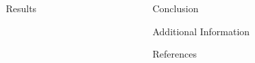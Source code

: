 \documentclass[final]{beamer}
\newlength{\sepwid}
\newlength{\onecolwid}
\newlength{\twocolwid}
\begin{document}
\begin{frame}[t]
\begin{columns}[t]
\begin{column}{\twocolwid}
\begin{columns}[t,totalwidth=\twocolwid]
\begin{column}{\onecolwid}
\end{column} %

\begin{column}{\onecolwid} %


\begin{block}{Results}


\end{block}


\end{column} %

\end{columns} %

\end{column} %

\begin{column}{\sepwid}\end{column} %

\begin{column}{\onecolwid} %


\begin{block}{Conclusion}

\end{block}

\begin{block}{Additional Information}

\end{block}

\begin{block}{References}

\small{
\vspace{0.75in}}

\end{block}



\end{column}
\end{columns}
\end{frame}
\end{document}
